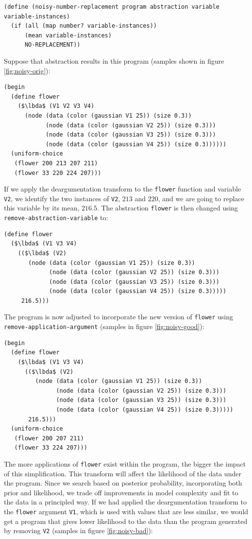 \documentclass[a4paper,10pt]{article}
\newcommand{\lbda}{\color[rgb]{0,.3,.7} \lambda}
\begin{document}
\begin{lstlisting}[frame=trbl]
(define (noisy-number-replacement program abstraction variable variable-instances)
  (if (all (map number? variable-instances))
      (mean variable-instances)
      NO-REPLACEMENT))
\end{lstlisting}

Suppose that abstraction results in this program (samples shown in figure \ref{fig:noisy-orig}):
\begin{lstlisting}[mathescape=true]
(begin
  (define flower
    ($\lbda$ (V1 V2 V3 V4)
      (node (data (color (gaussian V1 25)) (size 0.3))
            (node (data (color (gaussian V2 25)) (size 0.3)))
            (node (data (color (gaussian V3 25)) (size 0.3)))
            (node (data (color (gaussian V4 25)) (size 0.3))))))
  (uniform-choice
   (flower 200 213 207 211)
   (flower 33 220 224 207)))
\end{lstlisting}
If we apply the deargumentation transform to the \texttt{flower} function and variable \texttt{V2}, we identify the two instances of \texttt{V2}, $213$ and $220$, and we are going to replace this variable by its mean, $216.5$.  The abstraction \texttt{flower} is then changed using \texttt{remove-abstraction-variable} to:
\begin{lstlisting}
(define flower
  ($\lbda$ (V1 V3 V4)
    (($\lbda$ (V2)
       (node (data (color (gaussian V1 25)) (size 0.3))
             (node (data (color (gaussian V2 25)) (size 0.3)))
             (node (data (color (gaussian V3 25)) (size 0.3)))
             (node (data (color (gaussian V4 25)) (size 0.3)))))
     216.5)))
\end{lstlisting}
The program is now adjusted to incorporate the new version of \texttt{flower} using \texttt{remove-application-argument} (samples in figure \ref{fig:noisy-good}):
\begin{lstlisting}[mathescape=true]
(begin
  (define flower
    ($\lbda$ (V1 V3 V4)
      (($\lbda$ (V2)
         (node (data (color (gaussian V1 25)) (size 0.3))
               (node (data (color (gaussian V2 25)) (size 0.3)))
               (node (data (color (gaussian V3 25)) (size 0.3)))
               (node (data (color (gaussian V4 25)) (size 0.3)))))
       216.5)))
  (uniform-choice
   (flower 200 207 211)
   (flower 33 224 207)))
\end{lstlisting}
The more applications of \texttt{flower} exist within the program, the bigger the impact of this simplification. This transform will affect the likelihood of the data under the program. Since we search based on posterior probability, incorporating both prior and likelihood, we trade off improvements in model complexity and fit to the data in a principled way. If we had applied the deargumentation transform to the \texttt{flower} argument \texttt{V1}, which is used with values that are less similar, we would get a program that gives lower likelihood to the data than the program generated by removing \texttt{V2} (samples in figure \ref{fig:noisy-bad}):
\end{document}
